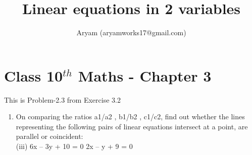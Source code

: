 \documentclass[10pt]{article}
\title{Linear equations in 2 variables}
\author{Aryam (aryamworks17@gmail.com)}
\begin{document}
\maketitle
\section*{Class 10$^{th}$ Maths - Chapter 3}
This is Problem-2.3 from Exercise 3.2
\begin{enumerate}
\item On comparing the ratios a1/a2 , b1/b2 , c1/c2, find out whether the lines representing the following pairs of linear equations intersect at a point, are parallel or coincident:\\
(iii) 6x – 3y + 10 = 0
2x – y + 9 = 0\\

\end{enumerate}
\end{document}
